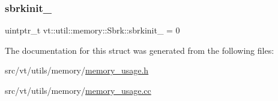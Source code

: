 \mbox{\label{structvt_1_1util_1_1memory_1_1_sbrk_a583d05e2d35145d77402a3a84b3399ae}} 
\subsubsection{\texorpdfstring{sbrkinit\+\_\+}{sbrkinit\_}}
{\footnotesize\ttfamily uintptr\+\_\+t vt\+::util\+::memory\+::\+Sbrk\+::sbrkinit\+\_\+ = 0\hspace{0.3cm}{\ttfamily [private]}}



The documentation for this struct was generated from the following files\+:\begin{DoxyCompactItemize}
\item 
src/vt/utils/memory/\hyperlink{memory__usage_8h}{memory\+\_\+usage.\+h}\item 
src/vt/utils/memory/\hyperlink{memory__usage_8cc}{memory\+\_\+usage.\+cc}\end{DoxyCompactItemize}
